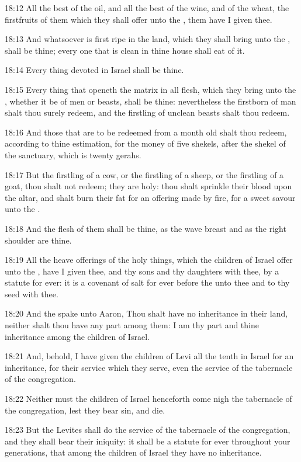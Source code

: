 18:12 All the best of the oil, and all the best of the wine, and of
the wheat, the firstfruits of them which they shall offer unto the
\LORD, them have I given thee.

18:13 And whatsoever is first ripe in the land, which they shall bring
unto the \LORD, shall be thine; every one that is clean in thine house
shall eat of it.

18:14 Every thing devoted in Israel shall be thine.

18:15 Every thing that openeth the matrix in all flesh, which they
bring unto the \LORD, whether it be of men or beasts, shall be thine:
nevertheless the firstborn of man shalt thou surely redeem, and the
firstling of unclean beasts shalt thou redeem.

18:16 And those that are to be redeemed from a month old shalt thou
redeem, according to thine estimation, for the money of five shekels,
after the shekel of the sanctuary, which is twenty gerahs.

18:17 But the firstling of a cow, or the firstling of a sheep, or the
firstling of a goat, thou shalt not redeem; they are holy: thou shalt
sprinkle their blood upon the altar, and shalt burn their fat for an
offering made by fire, for a sweet savour unto the \LORD.

18:18 And the flesh of them shall be thine, as the wave breast and as
the right shoulder are thine.

18:19 All the heave offerings of the holy things, which the children
of Israel offer unto the \LORD, have I given thee, and thy sons and thy
daughters with thee, by a statute for ever: it is a covenant of salt
for ever before the \LORD unto thee and to thy seed with thee.

18:20 And the \LORD spake unto Aaron, Thou shalt have no inheritance in
their land, neither shalt thou have any part among them: I am thy part
and thine inheritance among the children of Israel.

18:21 And, behold, I have given the children of Levi all the tenth in
Israel for an inheritance, for their service which they serve, even
the service of the tabernacle of the congregation.

18:22 Neither must the children of Israel henceforth come nigh the
tabernacle of the congregation, lest they bear sin, and die.

18:23 But the Levites shall do the service of the tabernacle of the
congregation, and they shall bear their iniquity: it shall be a
statute for ever throughout your generations, that among the children
of Israel they have no inheritance.

